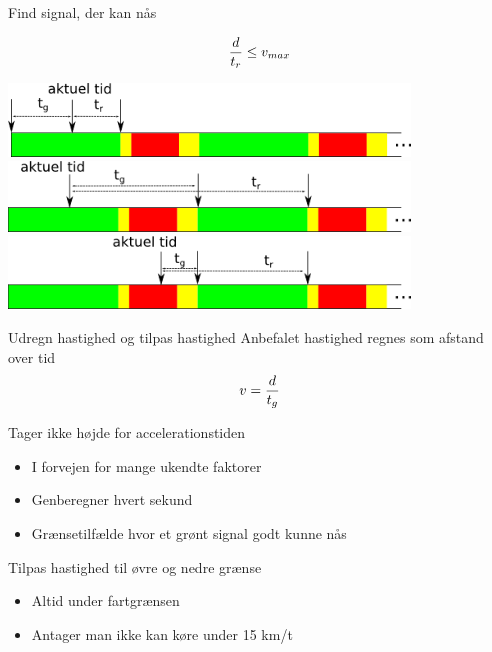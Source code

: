 \begin{frame}{Find signal, der kan nås}

\[\frac{d}{t_{r}}\leq v_{max}\]

\begin{center}
\includegraphics[width=0.8\textwidth]{../images/algphases1.png}
\vspace{5mm}
\includegraphics[width=0.8\textwidth]{../images/algphases2.png}
\vspace{5mm}
\includegraphics[width=0.8\textwidth]{../images/algphases3.png}
\end{center}
\end{frame}

\begin{frame}{Udregn hastighed og tilpas hastighed}
Anbefalet hastighed regnes som afstand over tid
\[v = \frac{d}{t_{g}}\]

Tager ikke højde for accelerationstiden
\begin{itemize}
\item I forvejen for mange ukendte faktorer
\item Genberegner hvert sekund
\item Grænsetilfælde hvor et grønt signal godt kunne nås
\end{itemize}

\vspace{5mm}
Tilpas hastighed til øvre og nedre grænse
\begin{itemize}
\item Altid under fartgrænsen
\item Antager man ikke kan køre under 15 km/t
\end{itemize}

\end{frame}